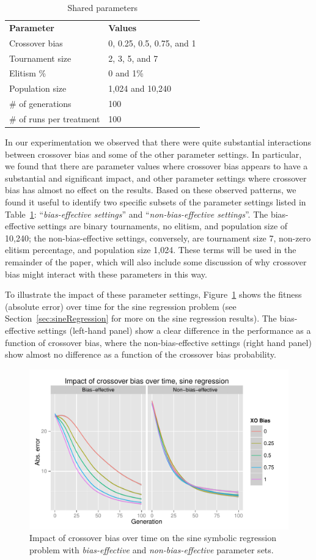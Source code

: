\documentclass{sig-alternate}
\begin{document}
\begin{table}[tb]
\begin{center}
\begin{tabular}{ll}
\textbf{Parameter} & \textbf{Values} \\
Crossover bias & 0, 0.25, 0.5, 0.75, and 1 \\
Tournament size & 2, 3, 5, and 7 \\
Elitism \% & 0 and 1\% \\
Population size & 1,024 and 10,240 \\
\# of generations & 100 \\
\# of runs per treatment & 100
\end{tabular}
\end{center}
\vspace{-0.5cm}
\caption{Shared parameters}
\label{tab:sharedParameters}
\end{table}

In our experimentation we observed that
there were quite substantial interactions between crossover bias and some of
the other parameter settings. In particular, we found that there are parameter values where crossover bias appears to
have a substantial and significant impact, and other parameter settings where crossover bias has almost no effect on
the results. Based on these observed patterns, we found it useful to identify two specific subsets of the parameter
settings listed in Table~\ref{tab:sharedParameters}: ``\emph{bias-effective settings}'' and ``\emph{non-bias-effective
settings}''. The bias-effective settings are binary tournaments, no elitism, and population size of 10,240; the
non-bias-effective settings, conversely, are tournament size 7, non-zero elitism percentage, and population size 1,024.
These terms will be used in the remainder of the paper, which will also include some discussion of why crossover bias
might interact with these parameters in this way.

To illustrate the impact of these parameter settings, 
Figure~\ref{fig:sineFitnessVsGenFacets} shows the fitness (absolute error) over time for the sine regression problem
(see Section~\ref{sec:sineRegression} for more on the sine regression results). 
The bias-effective settings (left-hand panel) show a clear difference in the performance as a function of 
crossover bias, where the non-bias-effective settings (right hand panel) show almost no difference as a function of
the crossover bias probability.

\begin{figure}
	\centering
	\includegraphics[width=0.45 \textwidth]{Plots/Sine_fitness_vs_gen_facets.pdf}
	\caption{Impact of crossover bias over time on the sine symbolic regression problem with
		\emph{bias-effective} and \emph{non-bias-effective} parameter sets.}
	\label{fig:sineFitnessVsGenFacets}
\end{figure}
\end{document}
